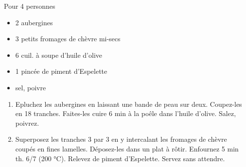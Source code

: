 {Pour 4 personnes}{\begin{itemize}
	\item 2 aubergines
	\item 3 petits fromages de chèvre mi-secs
	\item 6 cuil. à soupe d'huile d'olive
	\item 1 pincée de piment d'Espelette
	\item sel, poivre
\end{itemize}}
{\phantom{.}

\bigskip
\begin{enumerate}
	\item Epluchez les aubergines en laissant une bande de peau sur deux. Coupez-les en 18 tranches. Faites-les cuire 6 min à la poêle dans l'huile d'olive. Salez, poivrez.
	\item Superposez les tranches 3 par 3 en y intercalant les fromages de chèvre coupés en fines lamelles. Déposez-les dans un plat à rôtir. Enfournez 5 min th. 6/7 (200 °C). Relevez de piment d'Espelette. Servez sans attendre.
\end{enumerate}

\bigskip
\phantom{.}}

